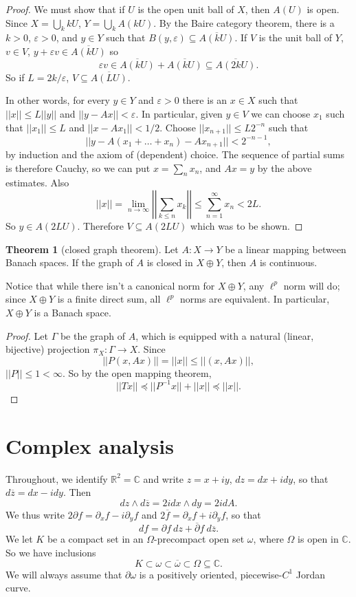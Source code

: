 \documentclass[12pt]{report}
\newcommand{\RR}{\mathbb{R}}
\newcommand{\CC}{\mathbb{C}}
\theoremstyle{definition}
\newtheorem{theorem}{Theorem}[chapter]
\begin{document}
\begin{proof}
    We must show that if $U$ is the open unit ball of $X$, then $A(U)$ is open. Since $X = \bigcup_k kU$, $Y = \bigcup_k A(kU)$. By the Baire category theorem, there is a $k > 0$, $\varepsilon > 0$, and $y \in Y$ such that $B(y, \varepsilon) \subseteq \overline{A(kU)}$. If $V$ is the unit ball of $Y$, $v \in V$, $y+\varepsilon v \in \overline{A(kU)}$ so
    $$\varepsilon v \in \overline{A(kU)} + \overline{A(kU)} \subseteq \overline{A(2kU)}.$$
    So if $L = 2k/\varepsilon$, $V \subseteq \overline{A(LU)}$.

    In other words, for every $y \in Y$ and $\varepsilon > 0$ there is an $x \in X$ such that $||x|| \leq L||y||$ and $||y-Ax|| < \varepsilon$. In particular, given $y \in V$ we can choose $x_1$ such that $||x_1|| \leq L$ and $||x-Ax_1|| < 1/2$. Choose $||x_{n+1}|| \leq L2^{-n}$ such that
    $$||y - A(x_1 + \dots + x_n) - Ax_{n+1}|| < 2^{-n-1},$$
    by induction and the axiom of (dependent) choice. The sequence of partial sums is therefore Cauchy, so we can put $x = \sum_n x_n$, and $Ax = y$ by the above estimates. Also
    $$||x|| = \lim_{n \to \infty} \left|\left| \sum_{k\leq n} x_k\right|\right| \leq \sum_{n=1}^\infty x_n < 2L.$$
    So $y \in A(2LU)$. Therefore $V \subseteq A(2LU)$ which was to be shown.
\end{proof}
\begin{theorem}[closed graph theorem]
    Let $A: X \to Y$ be a linear mapping between Banach spaces. If the graph of $A$ is closed in $X \oplus Y$, then $A$ is continuous.
\end{theorem}
    Notice that while there isn't a canonical norm for $X \oplus Y$, any $\ell^p$ norm will do; since $X \oplus Y$ is a finite direct sum, all $\ell^p$ norms are equivalent. In particular, $X \oplus Y$ is a Banach space.
\begin{proof}
    Let $\Gamma$ be the graph of $A$, which is equipped with a natural (linear, bijective) projection $\pi_X: \Gamma \to X$. Since
    $$||P(x, Ax)|| = ||x|| \leq ||(x, Ax)||,$$
    $||P|| \leq 1 < \infty$. So by the open mapping theorem,
    $$||Tx|| \preceq ||P^{-1}x|| + ||x|| \preceq ||x||.$$
\end{proof}


\chapter{Complex analysis}
Throughout, we identify $\RR^2 = \CC$ and write $z = x + iy$, $dz = dx + idy$, so that $d\overline z = dx - i dy$. Then
$$dz \wedge d\overline z = 2i dx \wedge dy = 2i dA.$$
We thus write $2 \partial f = \partial_x f - i\partial_y f$ and $2\overline f = \partial_x f + i\partial_y f$, so that
$$df = \partial f ~dz + \overline \partial f ~d\overline z.$$
We let $K$ be a compact set in an $\Omega$-precompact open set $\omega$, where $\Omega$ is open in $\CC$. So we have inclusions
$$K \subset \omega \subset \overline \omega \subset \Omega \subseteq \CC.$$
We will always assume that $\partial \omega$ is a positively oriented, piecewise-$C^1$ Jordan curve.
\end{document}
